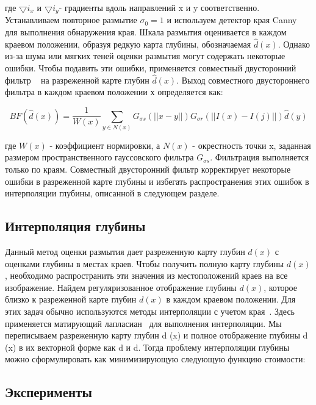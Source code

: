 где $\bigtriangledown i_x$ и $\bigtriangledown i_y$- градиенты вдоль направлений x и y соответственно. Устанавливаем повторное размытие $\sigma_0=1$ и используем детектор края Canny ~\cite{IEEE} для выполнения обнаружения края.
Шкала размытия оценивается в каждом краевом положении, образуя редкую
карта глубины, обозначаемая $\hat{d}(x)$. Однако из-за шума или мягких теней оценки размытия могут содержать некоторые ошибки. Чтобы подавить эти ошибки, применяется совместный двусторонний фильтр ~\cite{ACM} на разреженной карте глубин $\hat{d}(x)$. Выход совместного двустороннего фильтра в каждом краевом положении х определяется как:

\begin{equation}\label{eq:5}
BF(\hat{d}(x))=\frac{1}{W(x)}\sum_{y\in N(x)}G_{\sigma s}(||x-y||)G_{\sigma r}(||I(x)-I(j)||)\hat{d}(y)
\end{equation}

где $W(x)$ - коэффициент нормировки, а $N(x)$ - окрестность точки x, заданная размером пространственного гауссовского фильтра $G_{\sigma s}$. Фильтрация выполняется только по краям. Совместный двусторонний фильтр корректирует некоторые ошибки в разреженной карте глубины и избегать распространения этих ошибок в интерполяции глубины, описанной в следующем разделе.


\subsection{Интерполяция глубины}

Данный метод оценки размытия дает разреженную карту глубин $d(x)$ с оценками глубины в местах краев. Чтобы получить полную карту глубины $d(x)$, необходимо распространить эти значения из местоположений краев на все изображение. Найдем регуляризованное отображение глубины $d(x)$, которое близко к разреженной карте глубин $d(x)$ в каждом краевом положении. Для этих задач обычно используются методы интерполяции с учетом края~\cite{ACM2}. Здесь применяется матирующий лапласиан~\cite{IEEE2} для выполнения интерполяции.
Мы переписываем разреженную карту глубин d (x) и полное отображение глубины d (x) в их векторной форме как d и d. Тогда проблему интерполяции глубины можно сформулировать как минимизирующую следующую функцию стоимости:


\subsection{Эксперименты}

